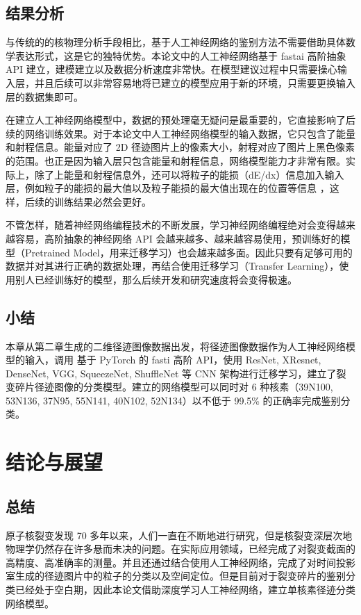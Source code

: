 \documentclass[AutoFakeBold]{LZUThesis}
\begin{document}
\section{结果分析}
与传统的的核物理分析手段相比，基于人工神经网络的鉴别方法不需要借助具体数学表达形式，这是它的独特优势。本论文中的人工神经网络基于 fastai 高阶抽象 API 建立，建模建立以及数据分析速度非常快。在模型建议过程中只需要操心输入层，并且后续可以非常容易地将已建立的模型应用于新的环境，只需要更换输入层的数据集即可。

在建立人工神经网络模型中，数据的预处理毫无疑问是最重要的，它直接影响了后续的网络训练效果。对于本论文中人工神经网络模型的输入数据，它只包含了能量和射程信息。能量对应了 2D 径迹图片上的像素大小，射程对应了图片上黑色像素的范围。也正是因为输入层只包含能量和射程信息，网络模型能力才非常有限。实际上，除了上能量和射程信息外，还可以将粒子的能损（dE/dx）信息加入输入层，例如粒子的能损的最大值以及粒子能损的最大值出现在的位置等信息 \cite{闫洋洋2018用于高精度裂变截面测量的时间投影室}，这样，后续的训练结果必然会更好。

不管怎样，随着神经网络编程技术的不断发展，学习神经网络编程绝对会变得越来越容易，高阶抽象的神经网络 API 会越来越多、越来越容易使用，预训练好的模型（Pretrained Model，用来迁移学习）也会越来越多面。因此只要有足够可用的数据并对其进行正确的数据处理，再结合使用迁移学习（Transfer Learning），使用别人已经训练好的模型，那么后续开发和研究速度将会变得极速。



\section{小结}
本章从第二章生成的二维径迹图像数据出发，将径迹图像数据作为人工神经网络模型的输入，调用 基于 PyTorch 的 fasti 高阶 API，使用 ResNet, XResnet, DenseNet, VGG, SqueezeNet, ShuffleNet 等 CNN 架构进行迁移学习，建立了裂变碎片径迹图像的分类模型。建立的网络模型可以同时对 6 种核素（39N100, 53N136, 37N95, 55N141, 40N102, 52N134）以不低于 99.5\% 的正确率完成鉴别分类。








\chapter{结论与展望}
\section{总结}
原子核裂变发现 70 多年以来，人们一直在不断地进行研究，但是核裂变深层次地物理学仍然存在许多悬而未决的问题。在实际应用领域，已经完成了对裂变截面的高精度、高准确率的测量。并且还通过结合使用人工神经网络，完成了对时间投影室生成的径迹图片中的粒子的分类以及空间定位。但是目前对于裂变碎片的鉴别分类已经处于空白期，因此本论文借助深度学习人工神经网络，建立单核素径迹分类网络模型。
\end{document}
